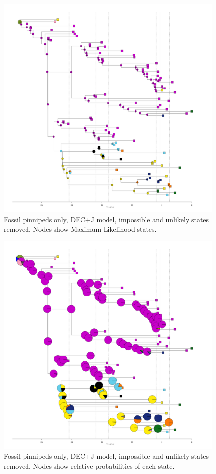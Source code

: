 \documentclass[a4paper, 12pt]{article}
\begin{document}
\begin{figure}[H]
 \centering
  \includegraphics[width = \linewidth]{figures/fossil-pinnipeds-DECj-unlikely-MLstates.png}
  \caption{Fossil pinnipeds only, DEC+J model, impossible and unlikely states removed. Nodes show Maximum Likelihood states.}
  \label{fig-fossil-decj-ml-unlikely}
\end{figure} 

\begin{figure}[H]
 \centering
  \includegraphics[width = \linewidth]{figures/fossil-pinnipeds-DECj-unlikely-pies.png}
  \caption{Fossil pinnipeds only, DEC+J model, impossible and unlikely states removed. Nodes show relative probabilities of each state.}
  \label{fig-fossil-decj-pie-unlikely}
\end{figure} 
\end{document}
